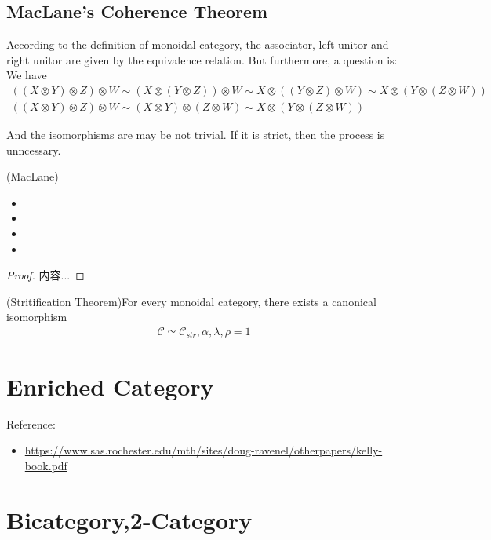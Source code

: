 \documentclass[Total.tex]{subfiles}
\begin{document}
		\section{MacLane's Coherence Theorem}
		
		According to the definition of monoidal category, the associator, left unitor and right unitor are given by the equivalence relation. But furthermore, a question is: We have
		\begin{gather*}
			((X\otimes Y)\otimes Z)\otimes W\sim (X\otimes (Y\otimes Z))\otimes W\sim X\otimes ((Y\otimes Z)\otimes W)\sim X\otimes (Y\otimes (Z\otimes W))\\
			((X\otimes Y)\otimes Z)\otimes W\sim (X\otimes Y)\otimes (Z\otimes W)\sim X\otimes (Y\otimes (Z\otimes W))
		\end{gather*}
		
		And the isomorphisms are may be not trivial. If it is strict, then the process is unncessary. 
		\begin{theorem}
			(MacLane) 
			\begin{itemize}
				\item 
				\item 
				\item 
				\item 
			\end{itemize}
		\end{theorem}
		\begin{proof}
			内容...
		\end{proof}
		
		\begin{corollary}
			(Stritification Theorem)For every monoidal category, there exists a canonical isomorphism
			\begin{gather*}
				\mathcal{C}\simeq \mathcal{C}_{str},\alpha,\lambda,\rho=1
			\end{gather*}
		\end{corollary}
	\chapter{Enriched Category}
		Reference:
		\begin{itemize}
			\item \url{ https://www.sas.rochester.edu/mth/sites/doug-ravenel/otherpapers/kelly-book.pdf}
		\end{itemize}
		
	\chapter{Bicategory,2-Category}
\end{document}

